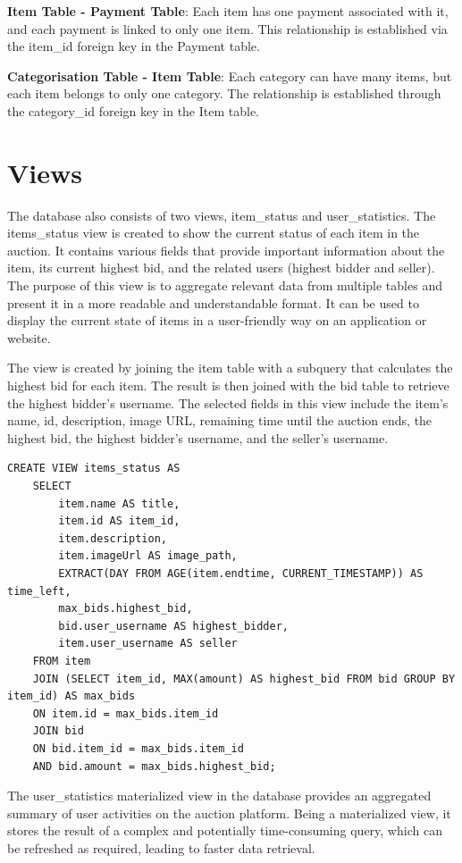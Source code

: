 \textbf{Item Table - Payment Table}: Each item has one payment associated with it, and each payment is linked to only one item. This relationship is established via the item\_id foreign key in the Payment table.

\textbf{Categorisation Table - Item Table}: Each category can have many items, but each item belongs to only one category. The relationship is established through the category\_id foreign key in the Item table.


\section{Views}
The database also consists of two views, item\_status and user\_statistics.
The items\_status view is created to show the current status of each item in the auction. It contains various fields that provide important information about the item, its current highest bid, and the related users (highest bidder and seller). The purpose of this view is to aggregate relevant data from multiple tables and present it in a more readable and understandable format. It can be used to display the current state of items in a user-friendly way on an application or website.

The view is created by joining the item table with a subquery that calculates the highest bid for each item. The result is then joined with the bid table to retrieve the highest bidder's username. The selected fields in this view include the item's name, id, description, image URL, remaining time until the auction ends, the highest bid, the highest bidder's username, and the seller's username.

\vspace{0.2cm}
\begin{lstlisting}[style=sqlStyle]
	CREATE VIEW items_status AS
	SELECT 
		item.name AS title, 
		item.id AS item_id, 
		item.description, 
		item.imageUrl AS image_path,  
		EXTRACT(DAY FROM AGE(item.endtime, CURRENT_TIMESTAMP)) AS time_left,
		max_bids.highest_bid,
		bid.user_username AS highest_bidder,
		item.user_username AS seller
	FROM item 
	JOIN (SELECT item_id, MAX(amount) AS highest_bid FROM bid GROUP BY item_id) AS max_bids 
	ON item.id = max_bids.item_id
	JOIN bid
	ON bid.item_id = max_bids.item_id
	AND bid.amount = max_bids.highest_bid;
\end{lstlisting}
\vspace{0.2cm}

The user\_statistics materialized view in the database provides an aggregated summary of user activities on the auction platform. Being a materialized view, it stores the result of a complex and potentially time-consuming query, which can be refreshed as required, leading to faster data retrieval.

